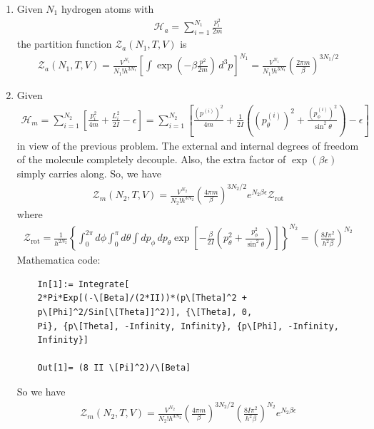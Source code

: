 \documentclass{article}
\theoremstyle{definition}
\newcommand{\ham}{\mathcal{H}}
\newcommand{\be}{\beta}
\newcommand{\f}[2]{\frac{#1}{#2}}
\newcommand{\lp}{\left(}
\newcommand{\rp}{\right)}
\newcommand{\lb}{\left[}
\newcommand{\rb}{\right]}
\newcommand{\lc}{\left\{}
\newcommand{\rc}{\right\}}
\begin{document}
\begin{enumerate}[label=(\alph*)]
	\item Given $N_1$ hydrogen atoms with
	\begin{align*}
	\ham_a = \sum^{N_1}_{i=1} \f{p_i^2}{2m}
	\end{align*}
	the partition function $\mathcal{Z}_a(N_1,T,V)$ is 
	\begin{align*}
	\mathcal{Z}_a(N_1,T,V) = \f{V^{N_1}}{N_1!h^{3N_1}}\lb \int \exp(-\be \f{p^2}{2m}) \,d^3p\rb^{N_1} = \boxed{{\f{V^{N_1}}{N_1! h^{3N_1}} \lp \f{2\pi m}{\be} \rp^{3N_1/2}}}
	\end{align*}
	
	\item Given 
	\begin{align*}
	\ham_m = \sum_{i=1}^{N_2} \lb \f{p_i^2}{4m} + \f{L_i^2}{2I} -\epsilon  \rb = \sum_{i=1}^{N_2} \lb \f{(p^{(i)})^2}{4m} + \f{1}{2I}\lp (p^{(i)}_\theta)^2 + \f{(p^{(i)}_\phi)^2}{\sin^2\theta} \rp -\epsilon  \rb
	\end{align*}
	in view of the previous problem. The external and internal degrees of freedom of the molecule completely decouple. Also, the extra factor of $\exp(\be\epsilon)$ simply carries along. So, we have
	\begin{align*}
	\mathcal{Z}_m(N_2,T,V) = {\f{V^{N_2}}{N_2! h^{3N_2}} \lp \f{4\pi m}{\be} \rp^{3N_2/2}} e^{N_2\be\epsilon} \mathcal{Z}_\text{rot}
	\end{align*}
	where
	\begin{align*}
	\mathcal{Z}_\text{rot} 
	= 
	 \f{1}{h^{2N_2}}\lc \int^{2\pi}_0 d\phi \int^\pi_0 d\theta \int dp_\phi\,dp_\theta \exp\lb -\f{\be}{2I} \lp p^2_\theta + \f{p_\phi^2}{\sin^2\theta}\rp \rb \rc^{N_2}
	=\lp\f{8I\pi^2}{h^2\be}\rp^{N_2}
	\end{align*}
	Mathematica code:
	\begin{lstlisting}
	In[1]:= Integrate[
	2*Pi*Exp[(-\[Beta]/(2*II))*(p\[Theta]^2 + 
	p\[Phi]^2/Sin[\[Theta]]^2)], {\[Theta], 0, 
	Pi}, {p\[Theta], -Infinity, Infinity}, {p\[Phi], -Infinity, 
	Infinity}]
	
	Out[1]= (8 II \[Pi]^2)/\[Beta]
	\end{lstlisting}
	
	So we have
	\begin{align*}
	\mathcal{Z}_m(N_2,T,V) = \boxed{{\f{V^{N_2}}{N_2! h^{3N_2}} \lp \f{4\pi m}{\be} \rp^{3N_2/2}}  \lp\f{8I\pi^2}{h^2\be}\rp^{N_2}e^{N_2\be\epsilon}}
	\end{align*}
	
	
	

\end{enumerate}
\end{document}
